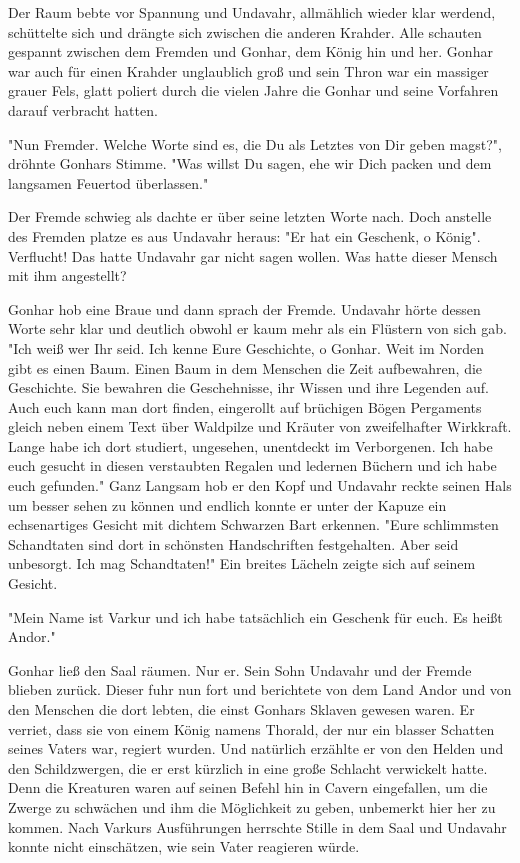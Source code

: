 \documentclass[10pt, a4paper, oneside]{book}
\begin{document}
\begin{multicols}{2}
Der Raum bebte vor Spannung und Undavahr, allmählich wieder klar werdend, schüttelte sich und drängte sich zwischen die anderen Krahder. Alle schauten gespannt zwischen dem Fremden und Gonhar, dem König hin und her. Gonhar war auch für einen Krahder unglaublich groß und sein Thron war ein massiger grauer Fels, glatt poliert durch die vielen Jahre die Gonhar und seine Vorfahren darauf verbracht hatten.\bigskip

"Nun Fremder. Welche Worte sind es, die Du als Letztes von Dir geben magst?", dröhnte Gonhars Stimme. "Was willst Du sagen,  ehe wir Dich packen und dem langsamen Feuertod überlassen."

Der Fremde schwieg als dachte er über seine letzten Worte nach. Doch anstelle des Fremden platze es aus Undavahr heraus: "Er hat ein Geschenk, o König". Verflucht! Das hatte Undavahr gar nicht sagen wollen. Was hatte dieser Mensch mit ihm angestellt?

Gonhar hob eine Braue und dann sprach der Fremde. Undavahr hörte dessen Worte sehr klar und deutlich obwohl er kaum mehr als ein Flüstern von sich gab.
"Ich weiß wer Ihr seid. Ich kenne Eure Geschichte, o Gonhar. Weit im Norden gibt es einen Baum. Einen Baum in dem Menschen die Zeit aufbewahren, die Geschichte. Sie bewahren die Geschehnisse, ihr Wissen und ihre Legenden auf. Auch euch kann man dort finden, eingerollt auf brüchigen Bögen Pergaments gleich neben einem Text über Waldpilze und Kräuter von zweifelhafter Wirkkraft. Lange habe ich dort studiert, ungesehen, unentdeckt im Verborgenen. Ich habe euch gesucht in diesen verstaubten Regalen und ledernen Büchern und ich habe euch gefunden." Ganz Langsam hob er den Kopf und Undavahr reckte seinen Hals um besser sehen zu können und endlich konnte er unter der Kapuze ein echsenartiges Gesicht mit dichtem Schwarzen Bart erkennen. "Eure schlimmsten Schandtaten sind dort in schönsten Handschriften festgehalten. Aber seid unbesorgt. Ich mag Schandtaten!" Ein breites Lächeln zeigte sich auf seinem Gesicht.

"Mein Name ist Varkur und ich habe tatsächlich ein Geschenk für euch. Es heißt Andor."\bigskip

Gonhar ließ den Saal räumen. Nur er. Sein Sohn Undavahr und der Fremde blieben zurück. Dieser fuhr nun fort und berichtete von dem Land Andor und von den Menschen die dort lebten, die einst Gonhars Sklaven gewesen waren. Er verriet, dass sie von einem König namens Thorald, der nur ein blasser Schatten seines Vaters war, regiert wurden. Und natürlich erzählte er von den Helden und den Schildzwergen, die er erst kürzlich in eine große Schlacht verwickelt hatte. Denn die Kreaturen waren auf seinen Befehl hin in Cavern eingefallen, um die Zwerge zu schwächen und ihm die Möglichkeit zu geben, unbemerkt hier her zu kommen. Nach Varkurs Ausführungen herrschte Stille in dem Saal und Undavahr konnte nicht einschätzen, wie sein Vater reagieren würde.\bigskip


\end{multicols}
\end{document}
